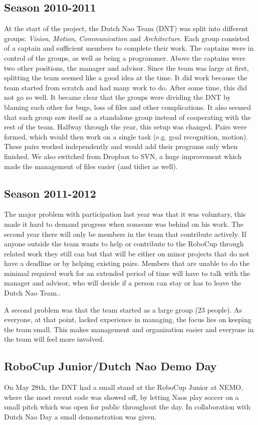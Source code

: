 \documentclass[11pt,a4paper,oneside]{article}
\begin{document}
\subsection{Season 2010-2011}
At the start of the project, the Dutch Nao Team (DNT) was split into different groups: {\it Vision}, {\it Motion}, {\it Communication} and {\it Architecture}. Each group consisted of a captain and sufficient members to complete their work. The captains were in control of the groups, as well as being a programmer. Above the captains were two other positions, the manager and advisor. Since the team was large at first, splitting the team seemed like a good idea at the time. It did work because the team started from scratch and had many work to do. After some time, this did not go so well. It became clear that the groups were dividing the DNT by blaming each other for bugs, loss of files and other complications. It also seemed that each group saw itself as a standalone group instead of cooperating with the rest of the team.
Halfway through the year, this setup was changed. Pairs were formed, which would then work on a single task (e.g. goal recognition, motion). These pairs worked independently and would add their programs only when finished. We also switched from Dropbox to SVN, a huge improvement which made the management of files easier (and tidier as well). 

\subsection{Season 2011-2012}
The major problem with participation last year was that it was voluntary, this made it hard to demand progress when someone was behind on his work. The second year there will only be members in the team that contribute actively. If anyone outside the team wants to help or contribute to the RoboCup through related work they still can but that will be either on minor projects that do not have a deadline or by helping existing pairs. Members that are unable to do the minimal required work for an extended period of time will have to talk with the manager and advisor, who will decide if a person can stay or has to leave the Dutch Nao Team..

A second problem was that the team started as a large group (23 people). As everyone, at that point, lacked experience in managing, the focus lies on keeping the team small. This makes management and organization easier and everyone in the team will feel more involved.  

\subsection{RoboCup Junior/Dutch Nao Demo Day}
On May 28th, the DNT had a small stand at the RoboCup Junior at NEMO, where the most recent code was showed off, by letting Naos play soccer on a small pitch which was open for public throughout the day. In collaboration with Dutch Nao Day a small demonstration was given.
 
\end{document}

